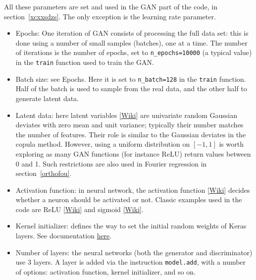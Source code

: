 \documentclass[oneside,10pt]{book}
\begin{document}
All these parameters are set and used in the GAN part of the code, in section~\ref{xcxxsdzs}. The only exception is the learning rate parameter.  \vspace{1ex}
\begin{itemize}
\item Epochs: One iteration of GAN consists of processing the full data set: this is done using a number of small samples (batches), one at a time.
  The number of iterations is the number of \textcolor{index}{epochs}, set to \texttt{n\_epochs=10000} (a typical value) in the \texttt{train} function used to train the GAN.
\item Batch size: see Epochs. Here it is set to \texttt{n\_batch=128} in the \texttt{train} function. Half of the batch is used to sample from the real data, and the other half to generate latent data.
\item Latent data: here \textcolor{index}{latent variables} [\href{https://en.wikipedia.org/wiki/Latent_and_observable_variables}{Wiki}] are univariate random Gaussian deviates with zero mean and unit variance; typically their number matches the number of features. Their role is similar to the Gaussian deviates in the copula method. However, using a uniform distribution on $[-1, 1]$ is worth exploring as many GAN functions
 (for instance ReLU) return values between 0 and 1. Such restrictions are also used in Fourier regression in section~\ref{orthofou}.
\item Activation function: 
 in neural network, the \textcolor{index}{activation function} [\href{https://en.wikipedia.org/wiki/Activation_function}{Wiki}] decides whether a \textcolor{index}{neuron} should be activated or not. Classic examples used in the code are \textcolor{index}{ReLU} [\href{https://en.wikipedia.org/wiki/Rectifier_(neural_networks)}{Wiki}] and \textcolor{index}{sigmoid} [\href{https://en.wikipedia.org/wiki/Sigmoid_function}{Wiki}].  
\item Kernel initializer: defines the way to set the initial random weights of Keras layers. See documentation
 \href{https://keras.io/api/layers/initializers/}{here}.
\item Number of layers: the neural networks  (both the generator and discriminator) use 3 layers. 
A layer is added via the instruction \texttt{model.add}, with a number of options: activation function, kernel initializer, and so on. 

\end{itemize}
\end{document}

